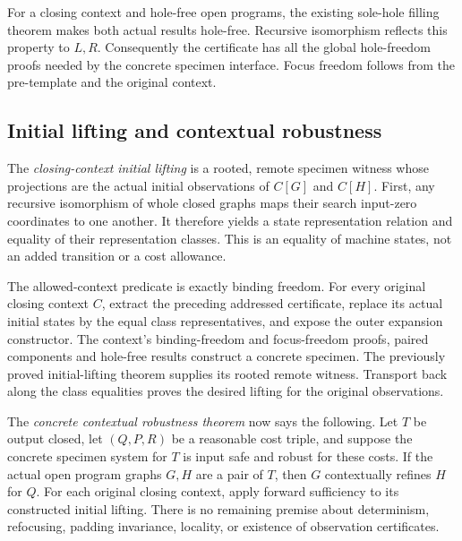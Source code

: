 
For a closing context and hole-free open programs, the existing sole-hole
filling theorem makes both actual results hole-free. Recursive isomorphism
reflects this property to $L,R$. Consequently the certificate has all the
global hole-freedom proofs needed by the concrete specimen interface.
Focus freedom follows from the pre-template and the original context.


\subsection{Initial lifting and contextual robustness}
The \emph{closing-context initial lifting} is a rooted, remote specimen witness
whose projections are the actual initial observations of $C[G]$ and $C[H]$.
First, any recursive isomorphism of whole closed graphs maps their search
input-zero coordinates to one another. It therefore yields a state
representation relation and equality of their representation classes. This
is an equality of machine states, not an added transition or a cost allowance.


The allowed-context predicate is exactly binding freedom. For every original
closing context $C$, extract the preceding addressed certificate, replace
its actual initial states by the equal class representatives, and expose the
outer expansion constructor. The context's binding-freedom and focus-freedom
proofs, paired components and hole-free results construct a concrete specimen.
The previously proved initial-lifting theorem supplies its rooted remote
witness. Transport back along the class equalities proves the desired lifting
for the original observations.


The \emph{concrete contextual robustness theorem} now says the following.
Let $T$ be output closed, let $(Q,P,R)$ be a reasonable cost triple, and
suppose the concrete specimen system for $T$ is input safe and robust for
these costs. If the actual open program graphs $G,H$ are a pair of $T$, then
$G$ contextually refines $H$ for $Q$. For each original closing context,
apply forward sufficiency to its constructed initial lifting. There is no
remaining premise about determinism, refocusing, padding invariance, locality,
or existence of observation certificates.

